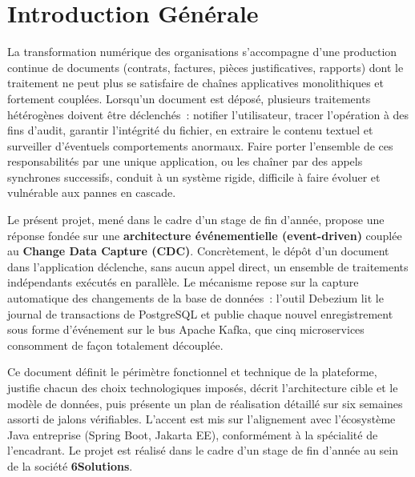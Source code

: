 \documentclass[12pt,a4paper,openany]{report}
\begin{document}
    \newpage

    \chapter{Introduction G\'en\'erale}

    La transformation num\'erique des organisations s'accompagne d'une production continue de documents (contrats, factures, pi\`eces justificatives, rapports) dont le traitement ne peut plus se satisfaire de cha\^ines applicatives monolithiques et fortement coupl\'ees. Lorsqu'un document est d\'epos\'e, plusieurs traitements h\'et\'erog\`enes doivent \^etre d\'eclench\'es~: notifier l'utilisateur, tracer l'op\'eration \`a des fins d'audit, garantir l'int\'egrit\'e du fichier, en extraire le contenu textuel et surveiller d'\'eventuels comportements anormaux. Faire porter l'ensemble de ces responsabilit\'es par une unique application, ou les cha\^iner par des appels synchrones successifs, conduit \`a un syst\`eme rigide, difficile \`a faire \'evoluer et vuln\'erable aux pannes en cascade.

    Le pr\'esent projet, men\'e dans le cadre d'un stage de fin d'ann\'ee, propose une r\'eponse fond\'ee sur une \textbf{architecture \'ev\'enementielle (event-driven)} coupl\'ee au \textbf{Change Data Capture (CDC)}. Concr\`etement, le d\'ep\^ot d'un document dans l'application d\'eclenche, sans aucun appel direct, un ensemble de traitements ind\'ependants ex\'ecut\'es en parall\`ele. Le m\'ecanisme repose sur la capture automatique des changements de la base de donn\'ees~: l'outil Debezium lit le journal de transactions de PostgreSQL et publie chaque nouvel enregistrement sous forme d'\'ev\'enement sur le bus Apache Kafka, que cinq microservices consomment de fa\c{c}on totalement d\'ecoupl\'ee.

    Ce document d\'efinit le p\'erim\`etre fonctionnel et technique de la plateforme, justifie chacun des choix technologiques impos\'es, d\'ecrit l'architecture cible et le mod\`ele de donn\'ees, puis pr\'esente un plan de r\'ealisation d\'etaill\'e sur six semaines assorti de jalons v\'erifiables. L'accent est mis sur l'alignement avec l'\'ecosyst\`eme Java entreprise (Spring Boot, Jakarta EE), conform\'ement \`a la sp\'ecialit\'e de l'encadrant. Le projet est r\'ealis\'e dans le cadre d'un stage de fin d'ann\'ee au sein de la soci\'et\'e \textbf{6Solutions}.
\end{document}
